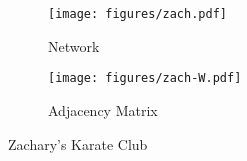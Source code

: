 \begin{figure}[t]
	\centering
	\begin{subfigure}{0.31\textwidth}
		\centering
		\texttt{[image: figures/zach.pdf]}
		\caption{Network}
	\end{subfigure}
	\begin{subfigure}{0.31\textwidth}
		\centering
		\texttt{[image: figures/zach-W.pdf]}
		\caption{Adjacency Matrix}
	\end{subfigure}
	\caption{Zachary's Karate Club}
	\label{fig:K}
\end{figure}
